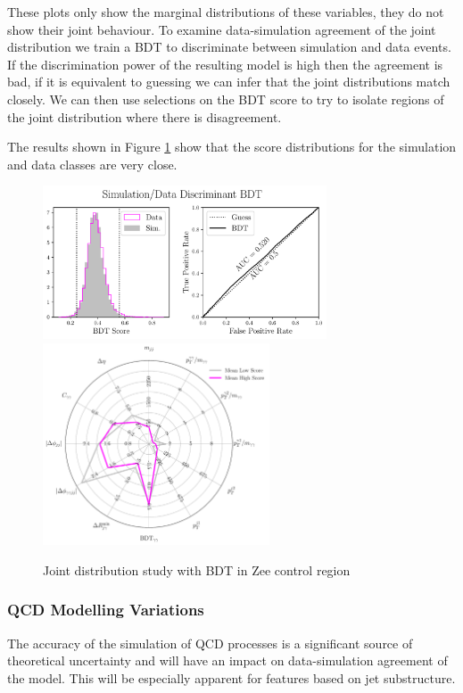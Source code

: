 These plots only show the marginal distributions of these variables, they do not show their joint behaviour. 
To examine data-simulation agreement of the joint distribution we train a BDT to discriminate between simulation and data events. 
If the discrimination power of the resulting model is high then the agreement is bad, if it is equivalent to guessing we can infer that the joint distributions match closely. 
We can then use selections on the BDT score to try to isolate regions of the joint distribution where there is disagreement. 

The results shown in Figure \ref{fig:event_categorisation:zee_bdt_validation} show that the score distributions for the simulation and data classes are very close. 
\begin{figure}[h!]
    \includegraphics[width=0.75\textwidth]{figures/event_selection/eng_feature_ROC_Zee_BDT.pdf}
    \includegraphics[width=0.6\textwidth]{figures/event_selection/eng_feature_radar_Zee_BDT.pdf}
    \caption{Joint distribution study with BDT in Zee control region}
    \label{fig:event_categorisation:zee_bdt_validation}
\end{figure}


\subsubsection{QCD Modelling Variations}
The accuracy of the simulation of QCD processes is a significant source of theoretical uncertainty and will have an impact on data-simulation agreement of the model. 
This will be especially apparent for features based on jet substructure.

